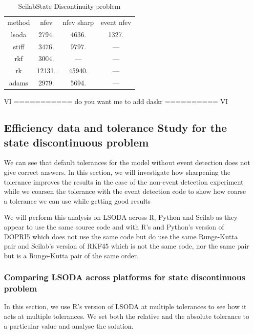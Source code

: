 \begin{table}[h]
\caption {ScilabState Discontinuity problem} \label{tab:state_discontinuity_scilab}
\begin{center}
\begin{tabular}{ c c c c } 
method & nfev & nfev sharp & event nfev  \\ 
lsoda  & 2794.  & 4636.  & 1327. \\
stiff  & 3476.  & 9797.  & ---   \\
rkf    & 3004.  &  ---   & ---   \\
rk     & 12131. & 45940. & ---   \\
adams  & 2979.  & 5694.  & ---   \\
\end{tabular}
\end{center}
\end{table}

VI ===========
do you want me to add daskr
========== VI

\subsection{Efficiency data and tolerance Study for the state discontinuous problem}
\label{subsection:state_tolerance_study}
We can see that default tolerances for the model without event detection does not give correct answers. In this section, we will investigate how sharpening the tolerance improves the results in the case of the non-event detection experiment while we coarsen the tolerance with the event detection code to show how coarse a tolerance we can use while getting good results

We will perform this analysis on LSODA across R, Python and Scilab as they appear to use the same source code and with R's and Python's version of DOPRI5 which does not use the same code but do use the same Runge-Kutta pair and Scilab's version of RKF45 which is not the same code, nor the same pair but is a Runge-Kutta pair of the same order. 

\subsubsection{Comparing LSODA across platforms for state discontinuous problem}

In this section, we use R's version of LSODA at multiple tolerances to see how it acts at multiple tolerances. We set both the relative and the absolute tolerance to a particular value and analyse the solution.

